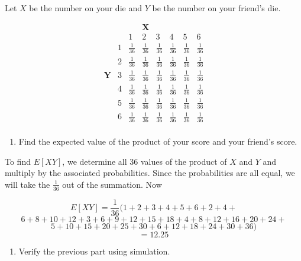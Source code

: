\documentclass[
]{book}
\newenvironment{Shaded}{\begin{snugshade}}{\end{snugshade}}
\newcommand{\DataTypeTok}[1]{\textcolor[rgb]{0.13,0.29,0.53}{#1}}
\newcommand{\DecValTok}[1]{\textcolor[rgb]{0.00,0.00,0.81}{#1}}
\newcommand{\KeywordTok}[1]{\textcolor[rgb]{0.13,0.29,0.53}{\textbf{#1}}}
\newcommand{\NormalTok}[1]{#1}
\newcommand{\OperatorTok}[1]{\textcolor[rgb]{0.81,0.36,0.00}{\textbf{#1}}}
\newcommand{\OtherTok}[1]{\textcolor[rgb]{0.56,0.35,0.01}{#1}}
\newcommand{\StringTok}[1]{\textcolor[rgb]{0.31,0.60,0.02}{#1}}
\providecommand{\tightlist}{%
  \setlength{\itemsep}{0pt}\setlength{\parskip}{0pt}}
\begin{document}
Let \(X\) be the number on your die and \(Y\) be the number on your friend's die.

\[
\begin{array}{cc|ccc} & & &\textbf{X} & \\ 
& & 1 & 2 & 3 & 4 & 5 & 6 \\
&\hline  1 & \frac{1}{36} & \frac{1}{36} & \frac{1}{36} & \frac{1}{36} & \frac{1}{36} & \frac{1}{36} \\
 & 2 & \frac{1}{36} & \frac{1}{36} & \frac{1}{36} & \frac{1}{36} & \frac{1}{36} & \frac{1}{36} \\
\textbf{Y}& 3 & \frac{1}{36} & \frac{1}{36} & \frac{1}{36} & \frac{1}{36} & \frac{1}{36} & \frac{1}{36} \\
& 4 & \frac{1}{36} & \frac{1}{36} & \frac{1}{36} & \frac{1}{36} & \frac{1}{36} & \frac{1}{36} \\
& 5 & \frac{1}{36} & \frac{1}{36} & \frac{1}{36} & \frac{1}{36} & \frac{1}{36} & \frac{1}{36} \\
& 6 & \frac{1}{36} & \frac{1}{36} & \frac{1}{36} & \frac{1}{36} & \frac{1}{36} & \frac{1}{36}  \\
\end{array} 
\]

\begin{enumerate}
\def\labelenumi{\alph{enumi}.}
\setcounter{enumi}{1}
\tightlist
\item
  Find the expected value of the product of your score and your friend's score.
\end{enumerate}

To find \(E[XY]\), we determine all 36 values of the product of \(X\) and \(Y\) and multiply by the associated probabilities. Since the probabilities are all equal, we will take the \(\frac{1}{36}\) out of the summation. Now

\[E[XY]=\frac{1}{36}(1+2+3+4+5+6+2+4+\]
\[6+8+10+12+3+6+9+12+15+18+4+8+12+16+20+24+\]
\[5+10+15+20+25+30+6+12+18+24+30+36)\]
\[=12.25\]

\begin{enumerate}
\def\labelenumi{\alph{enumi}.}
\setcounter{enumi}{2}
\tightlist
\item
  Verify the previous part using simulation.
\end{enumerate}

\begin{Shaded}
\end{Shaded}
\end{document}
